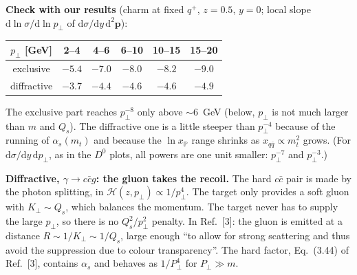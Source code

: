 \documentclass[12pt]{article}
\newcommand{\xpo}{x_{\mathbb{P}}}
\begin{document}
\textbf{Check with our results} (charm at fixed $q^+$, $z=0.5$, $y=0$; local slope
$\mathrm{d}\ln\sigma/\mathrm{d}\ln p_\perp$ of $\mathrm{d}\sigma/\mathrm{d}y\,\mathrm{d}^2\mathbf{p}$):
\begin{center}
\begin{tabular}{cccccc}
\toprule
$p_\perp$ [GeV] & 2--4 & 4--6 & 6--10 & 10--15 & 15--20 \\
\midrule
exclusive   & $-5.4$ & $-7.0$ & $-8.0$ & $-8.2$ & $-9.0$ \\
diffractive & $-3.7$ & $-4.4$ & $-4.6$ & $-4.6$ & $-4.9$ \\
\bottomrule
\end{tabular}
\end{center}
The exclusive part reaches $p_\perp^{-8}$ only above $\sim6$~GeV (below, $p_\perp$ is not much larger
than $m$ and $Q_s$). The diffractive one is a little steeper than $p_\perp^{-4}$ because of the running
of $\alpha_s(m_t)$ and because the $\ln\xpo$ range shrinks as $x_{q\bar q}\propto m_t^2$ grows. (For
$\mathrm{d}\sigma/\mathrm{d}y\,\mathrm{d}p_\perp$, as in the $D^0$ plots, all powers are one unit
smaller: $p_\perp^{-7}$ and $p_\perp^{-3}$.)

\textbf{Diffractive, $\gamma\to c\bar cg$: the gluon takes the recoil.} The hard $c\bar c$ pair is
made by the photon splitting, in $\mathcal{H}(z,p_\perp)\propto1/p_\perp^4$. The target only provides
a soft gluon with $K_\perp\sim Q_s$, which balances the momentum. The target never has to supply the
large $p_\perp$, so there is no $Q_s^2/p_\perp^2$ penalty. In Ref.~[3]: the gluon is emitted at a
distance $R\sim1/K_\perp\sim1/Q_s$, large enough ``to allow for strong scattering and thus avoid the
suppression due to colour transparency''. The hard factor, Eq.~(3.44) of Ref.~[3], contains
$\alpha_s$ and behaves as $1/P_\perp^4$ for $P_\perp\gg m$.
\end{document}

